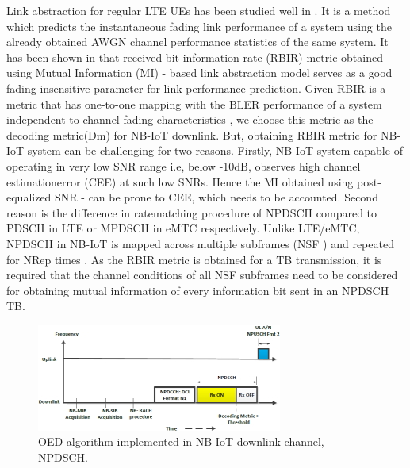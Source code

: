 \begin{multicols}{2}
Link abstraction for regular LTE UEs has been studied well in \cite{art1-key29}. It is a method which predicts the instantaneous fading link performance of a system using the already obtained AWGN channel performance statistics of the same system. It has been shown in \cite{art1-key29} that received bit information rate (RBIR) metric obtained using Mutual Information (MI) - based link abstraction model serves as a good fading insensitive parameter for link performance prediction. Given RBIR is a metric that has one-to-one mapping with the BLER performance of a system independent to channel fading characteristics \cite{art1-key07}, we choose this metric as the decoding metric(Dm) for NB-IoT downlink. But, obtaining RBIR metric for NB-IoT system can be challenging for two reasons. Firstly, NB-IoT system capable of operating in very low SNR range i.e, below -10dB, observes high channel estimationerror (CEE) at such low SNRs. Hence the MI obtained using post-equalized SNR \cite{art1-key29}-\cite{art1-key30} can be prone to CEE, which needs to be accounted. Second reason is the difference in ratematching procedure of NPDSCH compared to PDSCH in LTE or MPDSCH in eMTC respectively. Unlike LTE/eMTC, NPDSCH in NB-IoT is mapped across multiple subframes (NSF ) and repeated for NRep times \cite{art1-key27}. As the RBIR metric is obtained for a TB transmission, it is required that the channel conditions of all NSF subframes need to be considered for obtaining mutual information of every information bit sent in an NPDSCH TB.

\begin{figure}[H]
\centering
\includegraphics[scale=1.3]{src/Figures/chap1/chap1-fig08.jpg}
\caption{OED algorithm implemented in NB-IoT downlink channel, NPDSCH.}\label{chap1-fig08}
\end{figure}



\end{multicols}
